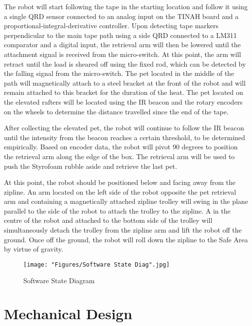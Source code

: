 \documentclass[11pt, oneside]{article} %
\begin{document}
The robot will start following the tape in the starting location and follow it using a single QRD sensor connected to an analog input on the TINAH board and a proportional-integral-derivative controller. Upon detecting tape markers perpendicular to the main tape path using a side QRD connected to a LM311 comparator and a digital input, the retrieval arm will then be lowered until the attachment signal is received from the micro-switch. At this point, the arm will retract until the load is sheared off using the fixed rod, which can be detected by the falling signal from the micro-switch. The pet located in the middle of the path will magnetically attach to a steel bracket at the front of the robot and will remain attached to this bracket for the duration of the heat. The pet located on the elevated rafters will be located using the IR beacon and the rotary encoders on the wheels to determine the distance travelled since the end of the tape.

After collecting the elevated pet, the robot will continue to follow the IR beacon until the intensity from the beacon reaches a certain threshold, to be determined empirically. Based on encoder data, the robot will pivot 90 degrees to position the retrieval arm along the edge of the box. The retrieval arm will be used to push the Styrofoam rubble aside and retrieve the last pet.

At this point, the robot should be positioned below and facing away from the zipline. An arm located on the left side of the robot opposite the pet retrieval arm and containing a magnetically attached zipline trolley will swing in the plane parallel to the side of the robot to attach the trolley to the zipline. A  in the centre of the robot and attached to the bottom side of the trolley will simultaneously detach the trolley from the zipline arm and lift the robot off the ground. Once off the ground, the robot will roll down the zipline to the Safe Area by virtue of gravity.

\begin{figure}[h]
	\centering
	\texttt{[image: "Figures/Software State Diag".jpg]}
	\caption[Software State Diagram]{Software State Diagram}
	\label{fig:SoftStates}
\end{figure}

\section{Mechanical Design}
\end{document}
